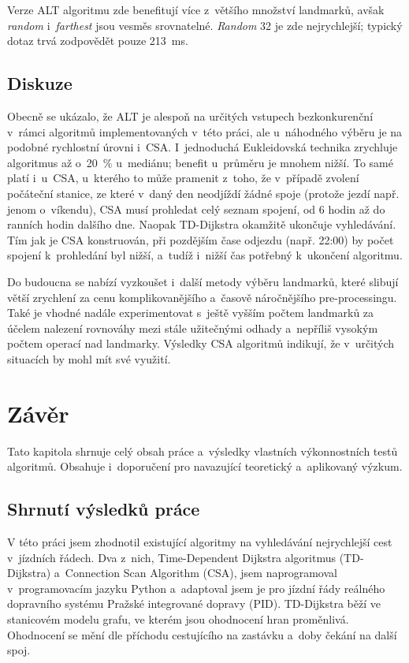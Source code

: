 Verze ALT algoritmu zde benefitují více z~většího množství landmarků, avšak \textit{random} i~\textit{farthest} jsou vesměs srovnatelné. \textit{Random} 32 je zde nejrychlejší; typický dotaz trvá zodpovědět pouze 213~ms.

\section{Diskuze}
Obecně se ukázalo, že ALT je alespoň na určitých vstupech bezkonkurenční v~rámci algoritmů implementovaných v~této práci, ale u~náhodného výběru je na podobné rychlostní úrovni i~CSA. I~jednoduchá Eukleidovská technika zrychluje algoritmus až o~20~\% u~mediánu; benefit u~průměru je mnohem nižší. To samé platí i~u~CSA, u~kterého to může pramenit z~toho, že v~případě zvolení počáteční stanice, ze které v~daný den neodjíždí žádné spoje (protože jezdí např. jenom o~víkendu), CSA musí prohledat celý seznam spojení, od 6 hodin až do ranních hodin dalšího dne. Naopak TD-Dijkstra okamžitě ukončuje vyhledávání. Tím jak je CSA konstruován, při pozdějším čase odjezdu (např. 22:00) by počet spojení k~prohledání byl nižší, a~tudíž i~nižší čas potřebný k~ukončení algoritmu.

Do budoucna se nabízí vyzkoušet i~další metody výběru landmarků, které slibují větší zrychlení za cenu komplikovanějšího a~časově náročnějšího pre-processingu. Také je vhodné nadále experimentovat s~ještě vyšším počtem landmarků za účelem nalezení rovnováhy mezi stále užitečnými odhady a~nepříliš vysokým počtem operací nad landmarky. Výsledky CSA algoritmů indikují, že v~určitých situacích by mohl mít své využití.

\chapter{Závěr}
Tato kapitola shrnuje celý obsah práce a~výsledky vlastních výkonnostních testů algoritmů. Obsahuje i~doporučení pro navazující teoretický a~aplikovaný výzkum.

\section{Shrnutí výsledků práce}
V této práci jsem zhodnotil existující algoritmy na vyhledávání nejrychlejší cest v~jízdních řádech. Dva z~nich, Time-Dependent Dijkstra algoritmus (TD-Dijkstra) a~Connection Scan Algorithm (CSA), jsem naprogramoval v~programovacím jazyku Python a~adaptoval jsem je pro jízdní řády reálného dopravního systému Pražské integrované dopravy (PID). TD-Dijkstra běží ve stanicovém modelu grafu, ve kterém jsou ohodnocení hran proměnlivá. Ohodnocení se mění dle příchodu cestujícího na zastávku a~doby čekání na další spoj. 

